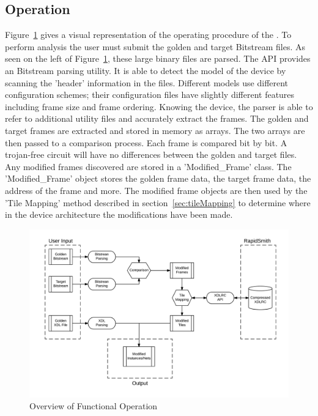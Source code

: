 \subsection{Operation} \label{sec:operation}
Figure~\ref{fig:Operation} gives a visual representation of the operating procedure of the \Name.
To perform analysis the user must submit the \gls{golden} and \gls{target} \gls{Bitstream} files.
As seen on the left of Figure~\ref{fig:Operation}, these large binary files are parsed. 
The \RapidSmith \acrshort{API} provides an \gls{Bitstream} parsing utility.
It is able to detect the model of the device by scanning the 'header' information in the files.
Different \Xilinx models use different configuration schemes; their configuration files have slightly different features including frame size and frame ordering. 
Knowing the device, the parser is able to refer to additional utility files and accurately extract the frames.
The \gls{golden} and \gls{target} frames are extracted and stored in memory as arrays.
The two arrays are then passed to a comparison process.
Each frame is compared bit by bit.
A trojan-free circuit will have no differences between the \gls{golden} and \gls{target} files.
Any modified frames discovered are stored in a 'Modified\_Frame' class.
The 'Modified\_Frame' object stores the \gls{golden} frame data, the \gls{target} frame data, the address of the frame and more.
The modified frame objects are then used by the 'Tile Mapping' method described in section~\ref{sec:tileMapping} to determine where in the device architecture the modifications have been made.
\begin{figure}[]
\centering
\includegraphics[width=1\linewidth]{Figures/Operation}
\caption[Overview of Functional Operation]{Overview of Functional Operation}
\label{fig:Operation}
\end{figure}
